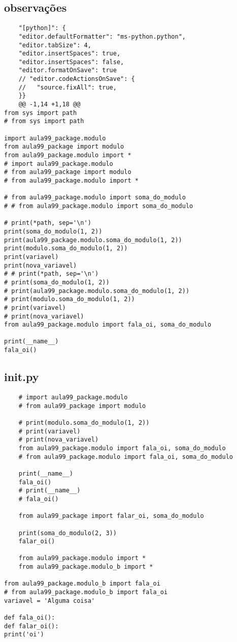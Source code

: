 \documentclass{article}
\begin{document}
\subsection{observações}
\begin{lstlisting}
    "[python]": {
    "editor.defaultFormatter": "ms-python.python",
    "editor.tabSize": 4,
    "editor.insertSpaces": true,
    "editor.insertSpaces": false,
    "editor.formatOnSave": true
    // "editor.codeActionsOnSave": {
    //   "source.fixAll": true,
    }}
    @@ -1,14 +1,18 @@
from sys import path
# from sys import path

import aula99_package.modulo
from aula99_package import modulo
from aula99_package.modulo import *
# import aula99_package.modulo
# from aula99_package import modulo
# from aula99_package.modulo import *

# from aula99_package.modulo import soma_do_modulo
# # from aula99_package.modulo import soma_do_modulo

# print(*path, sep='\n')
print(soma_do_modulo(1, 2))
print(aula99_package.modulo.soma_do_modulo(1, 2))
print(modulo.soma_do_modulo(1, 2))
print(variavel)
print(nova_variavel)
# # print(*path, sep='\n')
# print(soma_do_modulo(1, 2))
# print(aula99_package.modulo.soma_do_modulo(1, 2))
# print(modulo.soma_do_modulo(1, 2))
# print(variavel)
# print(nova_variavel)
from aula99_package.modulo import fala_oi, soma_do_modulo

print(__name__)
fala_oi()
\end{lstlisting}
\subsection{init.py}
\begin{lstlisting} 
    # import aula99_package.modulo
    # from aula99_package import modulo
    
    # print(modulo.soma_do_modulo(1, 2))
    # print(variavel)
    # print(nova_variavel)
    from aula99_package.modulo import fala_oi, soma_do_modulo
    # from aula99_package.modulo import fala_oi, soma_do_modulo
    
    print(__name__)
    fala_oi()
    # print(__name__)
    # fala_oi()
    
    from aula99_package import falar_oi, soma_do_modulo
    
    print(soma_do_modulo(2, 3))
    falar_oi()

    from aula99_package.modulo import *
    from aula99_package.modulo_b import *

from aula99_package.modulo_b import fala_oi
# from aula99_package.modulo_b import fala_oi
variavel = 'Alguma coisa'

def fala_oi():
def falar_oi():
print('oi')
\end{lstlisting}
\end{document}
